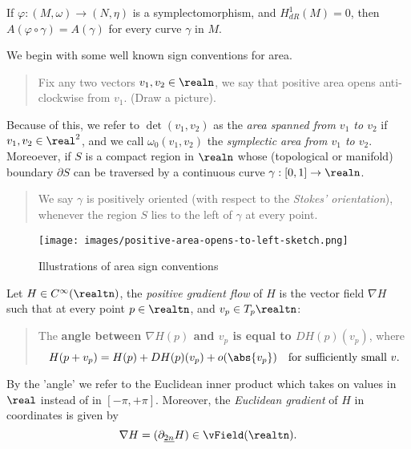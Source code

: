 \documentclass[../main-v2-manifolds.tex]{subfiles}
\begin{document}
\begin{corollary}
    If $\varphi: (M,\omega)\to (N,\eta)$ is a symplectomorphism, and $H_{dR}^{1}(M) = 0$, then $A(\varphi\circ\gamma) = A(\gamma)$ for every curve $\gamma$ in $M$.
\end{corollary}
We begin with some well known sign conventions for area.
\begin{quote}
    Fix any two vectors $v_1, v_2\in \realn$, we say that positive area opens anti-clockwise from $v_1$. (Draw a picture).
\end{quote}
Because of this, we refer to $\det(v_1, v_2)$ as the \emph{area spanned from $v_1$ to $v_2$} if $v_1,v_2\in\real^2$, and we call $\omega_0(v_1,v_2)$ the \emph{symplectic area from $v_1$ to $v_2$}. Moreoever, if $S$ is a compact region in $\realn$ whose (topological or manifold) boundary $\partial S$ can be traversed by a continuous curve $\gamma:[0,1]\to\realn$. 
\begin{quote}
We say $\gamma$ is positively oriented (with respect to the \emph{Stokes' orientation}), whenever the region $S$ lies to the left of $\gamma$ at every point.
\end{quote}
\begin{figure}[h!]
    \centering
    \texttt{[image: images/positive-area-opens-to-left-sketch.png]}
    \caption{Illustrations of area sign conventions}
    \label{fig:area sign conventions}
\end{figure}
\begin{remark}\label{rmk:gradient flow}
Let $H\in C^\infty(\realtn)$, the \emph{positive gradient flow} of $H$ is the vector field $\nabla H$ such that at every point $p\in \realtn$, and $v_p\in T_p \realtn$:
\begin{quote}
    The \textbf{angle between $\nabla{H}(p)$ and $v_p$ is equal to $DH(p)(v_p)$}, where
    \begin{equation}
    H(p+v_p) = H(p) + DH(p)(v_p) + o(\abs{v_p})\quad\text{for sufficiently small }v.
    \label{eq:Frechet Derivative as best possible linear approximation}
\end{equation}
\end{quote}
By the 'angle' we refer to the Euclidean inner product which takes on values in $\real$ instead of in $[-\pi, +\pi]$. Moreover, the \emph{Euclidean gradient} of $H$ in coordinates is given by
\[\nabla H = (\partial_{\underline{2n}}H)\in\vField(\realtn).\]
\end{remark}
\end{document}
